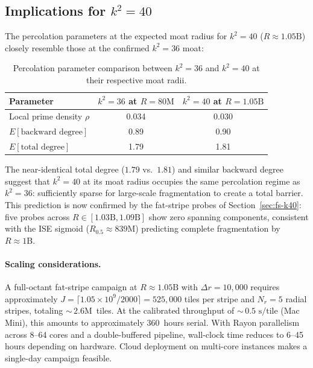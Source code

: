 \documentclass[11pt,a4paper]{article}
\newcommand{\Rhalf}{R_{0.5}}
\theoremstyle{definition}
\theoremstyle{plain}
\theoremstyle{remark}
\begin{document}
\subsection{Implications for \texorpdfstring{$k^2 = 40$}{k\texttwosuperior\ = 40}}\label{sec:fs-k40-implications}

The percolation parameters at the expected moat radius for $k^2 = 40$ ($R \approx 1.05\text{B}$) closely resemble those at the confirmed $k^2 = 36$ moat:

\begin{table}[ht]
\centering
\begin{tabular}{@{}lcc@{}}
\toprule
Parameter & $k^2 = 36$ at $R = 80\text{M}$ & $k^2 = 40$ at $R = 1.05\text{B}$ \\
\midrule
Local prime density $\rho$  & 0.034 & 0.030 \\
$E[\text{backward degree}]$ & 0.89  & 0.90 \\
$E[\text{total degree}]$    & 1.79  & 1.81 \\
\bottomrule
\end{tabular}
\caption{Percolation parameter comparison between $k^2 = 36$ and $k^2 = 40$ at their respective moat radii.}
\label{tab:k40-comparison}
\end{table}

The near-identical total degree ($1.79$ vs.\ $1.81$) and similar backward degree suggest that $k^2 = 40$ at its moat radius occupies the same percolation regime as $k^2 = 36$: sufficiently sparse for large-scale fragmentation to create a total barrier.  This prediction is now confirmed by the fat-stripe probes of Section~\ref{sec:fs-k40}: five probes across $R \in [1.03\text{B}, 1.09\text{B}]$ show zero spanning components, consistent with the ISE sigmoid ($\Rhalf \approx 839\text{M}$) predicting complete fragmentation by $R \approx 1\text{B}$.

\paragraph{Scaling considerations.}
A full-octant fat-stripe campaign at $R \approx 1.05\text{B}$ with $\Delta r = 10{,}000$ requires approximately $J = \lceil 1.05 \times 10^9 / 2000 \rceil = 525{,}000$ tiles per stripe and $N_r = 5$ radial stripes, totaling ${\sim}\,2.6\text{M}$~tiles.  At the calibrated throughput of ${\sim}\,0.5\text{ s/tile}$ (Mac Mini), this amounts to approximately $360$~hours serial.  With Rayon parallelism across 8--64 cores and a double-buffered pipeline, wall-clock time reduces to 6--45 hours depending on hardware.  Cloud deployment on multi-core instances makes a single-day campaign feasible.
\end{document}
